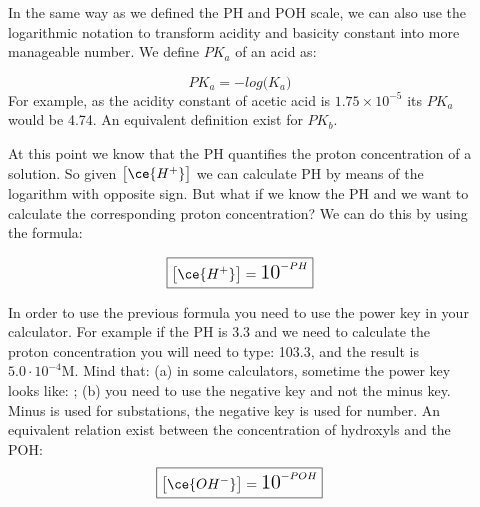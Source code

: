 \documentclass[main.tex]{subfiles}
\newcommand\chapterlabel{acids}
\begin{document}
\begin{description}
\item[]
In the same way as we defined the PH and POH scale, we can also use the logarithmic notation to transform acidity and basicity constant into more manageable number. We define $PK_a$ of an acid as:

 \begin{equation}
\boxed{PK_a=-log \big( K_a \big) }\label{\chapterlabel:equation13}
\end{equation}
For example, as the acidity constant of acetic acid is $1.75 \times 10^{-5}$ its $PK_a$ would be 4.74. An equivalent definition exist for $PK_b$.


\item[] At this point we know that the PH quantifies the proton concentration of a solution. So given $\big[\ce{H^+}\big]$ we can calculate PH by means of the logarithm with opposite sign. But what if we know the PH and we want to calculate the corresponding proton concentration? We can do this by using the formula:
 
 \begin{equation}
\boxed{\big[\ce{H^+}\big]=\textrm{\Large 10}^{-PH} }\label{\chapterlabel:equation6}
\end{equation}



In order to use the previous formula you need to use the power key in your calculator. For example if the PH is 3.3 and we need to calculate the proton concentration you will need to type: 10\keystroke{\large $\wedge$}\keystroke{\large $-$}3.3, and the result is $5.0\cdot 10^{-4}$M. Mind that: (a) in some calculators, sometime the power key looks like: ; (b) you need to use the negative key and not the minus key. Minus is used for substations, the negative key is used for number.
An equivalent relation exist between the concentration of hydroxyls and the POH:
 \begin{equation}
\boxed{\big[\ce{OH^-}\big]=\textrm{\Large 10}^{-POH} }\label{\chapterlabel:equation7}
\end{equation}


\end{description}
\end{document}
